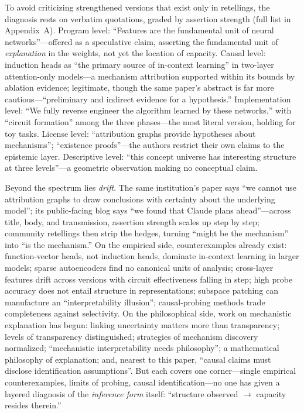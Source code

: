 \documentclass[10pt]{article}
\begin{document}
To avoid criticizing strengthened versions that exist only in retellings, the diagnosis rests on verbatim quotations, graded by assertion strength (full list in Appendix~A). Program level: ``Features are the fundamental unit of neural networks''\cite{olah2020zoomin}---offered as a speculative claim, asserting the fundamental unit of \emph{explanation} in the weights, not yet the location of capacity. Causal level: induction heads as ``the primary source of in-context learning'' in two-layer attention-only models\cite{olsson2022induction}---a mechanism attribution supported within its bounds by ablation evidence; legitimate, though the same paper's abstract is far more cautious---``preliminary and indirect evidence for a hypothesis.'' Implementation level: ``We fully reverse engineer the algorithm learned by these networks,'' with ``circuit formation'' among the three phases\cite{nanda2023progress}---the most literal version, holding for toy tasks. License level: ``attribution graphs provide hypotheses about mechanisms''; ``existence proofs''\cite{lindsey2025biology}---the authors restrict their own claims to the epistemic layer. Descriptive level: ``this concept universe has interesting structure at three levels''\cite{tegmark2024geometry}---a geometric observation making no conceptual claim.

Beyond the spectrum lies \emph{drift}. The same institution's paper says ``we cannot use attribution graphs to draw conclusions with certainty about the underlying model''\cite{lindsey2025biology}; its public-facing blog says ``we found that Claude plans ahead''\cite{anthropic2025thoughts}---across title, body, and transmission, assertion strength scales up step by step; community retellings then strip the hedges, turning ``might be the mechanism'' into ``is the mechanism.'' On the empirical side, counterexamples already exist: function-vector heads, not induction heads, dominate in-context learning in larger models\cite{yin2025which}; sparse autoencoders find no canonical units of analysis\cite{leask2025canonical}; cross-layer features drift across versions with circuit effectiveness falling in step\cite{anthropic2024crosscoders}; high probe accuracy does not entail structure in representations\cite{hewitt2019designing,belinkov2022probing}; subspace patching can manufacture an ``interpretability illusion''\cite{makelov2023illusion}; causal-probing methods trade completeness against selectivity\cite{canby2024reliable}. On the philosophical side, work on mechanistic explanation has begun: linking uncertainty matters more than transparency\cite{sullivan2022understanding}; levels of transparency distinguished\cite{creel2022transparency}; strategies of mechanism discovery normalized\cite{kastner2024explaining}; ``mechanistic interpretability needs philosophy''\cite{williams2025philosophy}; a mathematical philosophy of explanation\cite{ayonrinde2025mathematical}; and, nearest to this paper, ``causal claims must disclose identification assumptions''\cite{lin2026disclose}. But each covers one corner---single empirical counterexamples, limits of probing, causal identification---no one has given a layered diagnosis of the \emph{inference form} itself: ``structure observed $\to$ capacity resides therein.''
\end{document}
